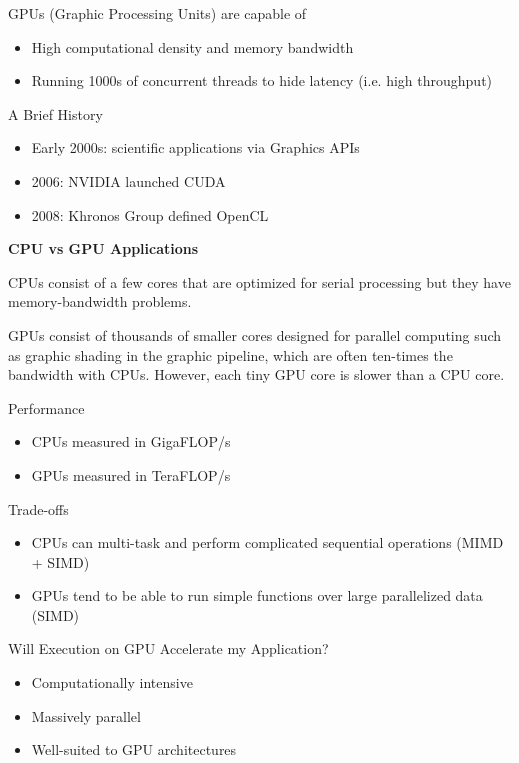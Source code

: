 \documentclass{article}
\begin{document}
GPUs (Graphic Processing Units) are capable of

\begin{itemize}
    \item High computational density and memory bandwidth
    \item Running 1000s of concurrent threads to hide latency (i.e. high throughput)
\end{itemize}

A Brief History

\begin{itemize}
    \item Early 2000s: scientific applications via Graphics APIs
    \item 2006: NVIDIA launched CUDA
    \item 2008: Khronos Group defined OpenCL
\end{itemize}

\textbf{CPU vs GPU Applications}

CPUs consist of a few cores that are optimized for serial processing but they have memory-bandwidth problems.

GPUs consist of thousands of smaller cores designed for parallel computing such as graphic shading in the graphic pipeline, which are often ten-times the bandwidth with CPUs. However, each tiny GPU core is slower than a CPU core.

Performance

\begin{itemize}
    \item CPUs measured in GigaFLOP/s
    \item GPUs measured in TeraFLOP/s
\end{itemize}

Trade-offs

\begin{itemize}
    \item CPUs can multi-task and perform complicated sequential operations (MIMD + SIMD)
    \item GPUs tend to be able to run simple functions over large parallelized data (SIMD)
\end{itemize}

Will Execution on GPU Accelerate my Application?

\begin{itemize}
    \item Computationally intensive
    \item Massively parallel
    \item Well-suited to GPU architectures
\end{itemize}
\end{document}
